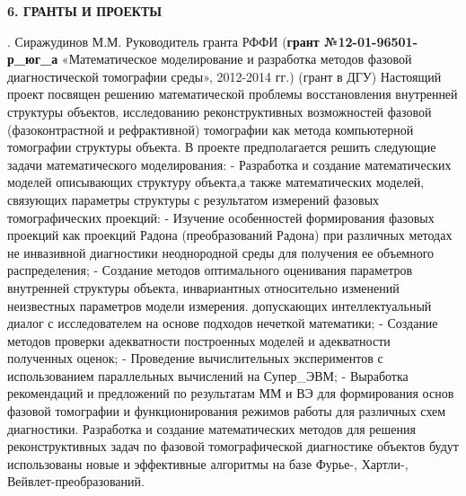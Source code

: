 \documentclass{article}
\begin{document}
\noindent \textbf{6. ГРАНТЫ И ПРОЕКТЫ}

\noindent

.  Сиражудинов М.М. Руководитель гранта РФФИ (\textbf{грант №12-01-96501-р\_юг\_а} «Математическое моделирование и разработка методов фазовой диагностической томографии среды», 2012-2014 гг.) (грант в ДГУ) Настоящий проект посвящен решению математической проблемы восстановления внутренней структуры объектов, исследованию реконструктивных возможностей фазовой (фазоконтрастной и рефрактивной) томографии как метода компьютерной томографии структуры объекта. В проекте предполагается решить следующие задачи математического моделирования: - Разработка и создание математических моделей описывающих структуру объекта,а также математических моделей, связующих параметры структуры с результатом измерений фазовых томографических проекций: - Изучение особенностей формирования фазовых проекций как проекций Радона (преобразований Радона) при различных методах не инвазивной диагностики неоднородной среды для получения ее объемного распределения; - Создание методов оптимального оценивания параметров внутренней структуры объекта, инвариантных относительно изменений неизвестных параметров модели измерения. допускающих интеллектуальный диалог с исследователем на основе подходов нечеткой математики; - Создание методов проверки адекватности построенных моделей и адекватности полученных оценок; - Проведение вычислительных экспериментов с использованием параллельных вычислений на Супер\_ЭВМ; - Выработка рекомендаций и предложений по результатам ММ и ВЭ для формирования основ фазовой томографии и функционирования режимов работы для различных схем диагностики. Разработка и создание математических методов для решения реконструктивных задач по фазовой томографической диагностике объектов будут использованы новые и эффективные алгоритмы на базе Фурье-, Хартли-, Вейвлет-преобразований.
\end{document}
